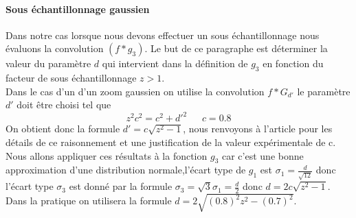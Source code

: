 \paragraph{Sous échantillonnage gaussien}
Dans notre cas lorsque nous devons effectuer un sous échantillonnage nous évaluons la convolution $(f*g_3)$. Le but de ce paragraphe est déterminer la valeur du paramètre $d$ qui intervient dans la définition de $g_3$ en fonction du facteur de sous échantillonnage $z>1$.\\
Dans le cas d'un d'un zoom gaussien on utilise la convolution $f*G_{d'}$ le paramètre $d'$ doit être choisi tel que 
\begin{equation*}
z^2 c^2=c^2 + d'^2     ~~~~~~~c= 0.8
\end{equation*}
On obtient donc la formule $d'=c\sqrt{z^2 - 1}$, nous renvoyons à l'article \cite{morel2011sift} pour les détails de ce raisonnement et une justification de la valeur expérimentale de c.\\
Nous allons appliquer ces résultats à la fonction $g_3$ car c'est une bonne approximation d'une distribution normale,l'écart type de $g_1$ est $\sigma_1=\frac{d}{\sqrt{12}}$ donc l'écart type $\sigma_3$ est donné par la formule $\sigma_3=\sqrt{3}\sigma_1=\frac{d}{2}$
donc $d=2c\sqrt{z^2 - 1}$.\\
Dans la pratique on utilisera la formule $d=2\sqrt{(0.8)^2 z^2 - (0.7)^2}$.\\
